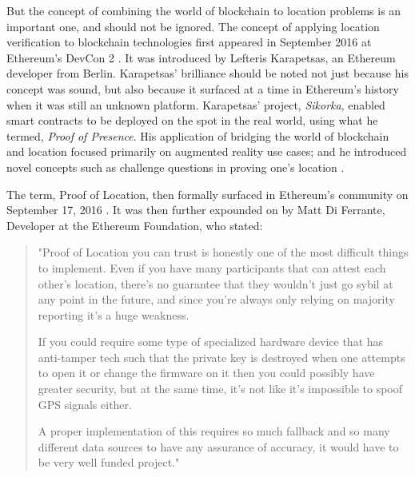 \documentclass{article}
\begin{document}
But the concept of combining the world of blockchain to location problems is an important one, and should not be ignored. The concept of applying location verification to blockchain technologies first appeared in September 2016 at Ethereum's DevCon 2 \cite{karapetsas-sikorka}. It was introduced by Lefteris Karapetsas, an Ethereum developer from Berlin. Karapetsas' brilliance should be noted not just because his concept was sound, but also because it surfaced at a time in Ethereum's history when it was still an unknown platform. Karapetsas' project, \textit{Sikorka}, enabled smart contracts to be deployed on the spot in the real world, using what he termed, \textit{Proof of Presence}. His application of bridging the world of blockchain and location focused primarily on augmented reality use cases; and he introduced novel concepts such as challenge questions in proving one's location \cite{karapetsas-sikorka}.

The term, Proof of Location, then formally surfaced in Ethereum's community on September 17, 2016 \cite{diferrante-proofoflocation}. It was then further expounded on by Matt Di Ferrante, Developer at the Ethereum Foundation, who stated:

\begin{quotation}
"Proof of Location you can trust is honestly one of the most difficult things to implement. Even if you have many participants that can attest each other's location, there's no guarantee that they wouldn't just go sybil at any point in the future, and since you're always only relying on majority reporting it's a huge weakness.

If you could require some type of specialized hardware device that has anti-tamper tech such that the private key is destroyed when one attempts to open it or change the firmware on it then you could possibly have greater security, but at the same time, it's not like it's impossible to spoof GPS signals either.

A proper implementation of this requires so much fallback and so many different data sources to have any assurance of accuracy, it would have to be very well funded project." \cite{diferrante-proofoflocation}
\end{quotation}
\end{document}

